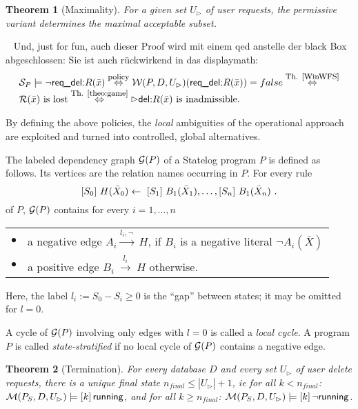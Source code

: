 \documentclass[twoside,11pt]{article}
\newtheorem{Theorem}{Theorem}
\theoremstyle{plain}
\def\rdel{\itorsf{req\_del:}}
\begin{document}
\begin{Theorem}[Maximality]
  For a given set $U_\rhd$ of user requests, the permissive variant
  determines the maximal acceptable subset.
\end{Theorem}
\begin{Proof}~
Und, just for fun, auch dieser Proof wird mit einem qed anstelle der
black Box abgeschlossen: Sie ist auch r\"uckwirkend in das displaymath:
\[\begin{array}[t]{l}
  \pl S_P \models \neg \rdel R(\bar x) 
  \stackrel{\mbox{\footnotesize policy}}{\Iff}
  \pl W(P,D,U_\rhd)(\rdel R(\bar x)) = false
  \stackrel{\mbox{\footnotesize Th. \ref{WinWFS}}}{\Iff} \\
  \pl R(\bar x) \mbox{ is lost}
  \stackrel{\mbox{\footnotesize Th. \ref{theo:game}}}{\Iff} 
  \extev \del R(\bar x) \mbox{ is inadmissible.}
 \end{array} \]
\end{Proof}

\noindent
By defining the above policies, the \emph{local} ambiguities of
the operational approach are exploited and turned into controlled, global
alternatives.

\begin{Definition}\label{def:depgraph}   The labeled dependency
  graph $\mathcal G(P)$ of a Statelog program $P$ is defined as
  follows.  Its vertices are the relation names occurring in $P$.  For
  every rule
\[  \sterm{S_0}\ H(\bar X_0) \la\ 
   \sterm{S_1}\ B_1(\bar X_1),\ldots,\sterm{S_n}\ B_1(\bar X_n)~.  \]
%
   of $P$, $\mathcal G(P)$ contains for every $i=1,\dots,n$

   \noindent \begin{tabular}{ll}
     $\bullet$ & a negative edge $A_i \stackrel{l_i,
       \neg}{\rightarrow}\ H$, if $B_i$ is a negative literal $\neg
     A_i(\bar X)$\\ 
     $\bullet$ & a positive edge $B_i\ \stackrel{l_i}{\rightarrow}\ H$
     otherwise.
   \end{tabular} \smallskip 

   \noindent Here,  the label $l_i:= S_0 - S_i \ge 0$ is the ``gap'' between
   states; it may be omitted for $l=0$.

   A cycle of $\mathcal G(P)$ involving only edges with $l=0$ is
   called a \emph{local cycle\/}.  A program $P$ is called
   \emph{state-stratified\/} if no local cycle of $\mathcal G(P)$
   contains a negative edge.
\end{Definition}
%
\begin{Theorem}[Termination]\label{StatelogTermination}
For every database $D$ and every set $U_\rhd$ of user delete
  requests, there is a unique final state $n_{final} \leq |U_\rhd|+1$,
  ie for all $k<n_{final}$: $\mathcal M(P_S,D,U_\rhd) \models
  [k]\,\textsf{running}$, and for all $k \ge n_{final}$: $\mathcal
  M(P_S,D,U_\rhd) \models [k]\, \lnot \textsf{running}$.
\end{Theorem}
\end{document}
